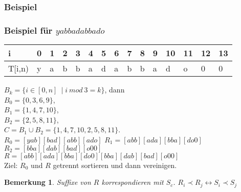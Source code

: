 \documentclass{beamer}
\newtheorem{remark}{Bemerkung}
\begin{document}
\subsubsection{Beispiel}

\begin{frame}[fragile]
\frametitle{Beispiel für $yabbadabbado$}
\begin{table}
\begin{tabular}{l|l l l l l l l l l l l l l l}
    \toprule
    i & 0 & 1 & 2 & 3 & 4 & 5 & 6 & 7 & 8 & 9 & 10 & 11 & 12 & 13 \\
    \midrule
    T[i,n) & y & a & b & b & a & d & a & b & b & a & d & o & 0 & 0  \\
    \bottomrule
\end{tabular}
\end{table}
$B_k = \{ i \in [0,n]\ \mid i \: mod \: 3 = k \}$, dann \\
$B_0 = \{0, 3, 6, 9 \}$,                                \\
$B_1 = \{1, 4, 7, 10 \}$,                               \\
$B_2 = \{2, 5, 8, 11 \}$,                               \\
\medskip
$C   = B_1 \cup B_2 = \{1, 4, 7, 10, 2, 5, 8, 11\}$.    \\
\medskip
$R_0 = [yab][bad][abb][ado]$
$R_1 = [abb][ada][bba][do0]$                            \\
$R_2 = [bba][dab][bad][o00]$                            \\
\medskip
$R   = [abb][ada][bba][do0][bba][dab][bad][o00]$        \\
\medskip
Ziel: $R_0$ und $R$ getrennt sortieren und dann vereinigen.
\begin{remark}
Suffixe von $R$ korrespondieren mit $S_c$. $R_i \prec R_j \leftrightarrow S_i \prec S_j$
\end{remark}
\end{frame}
\end{document}
